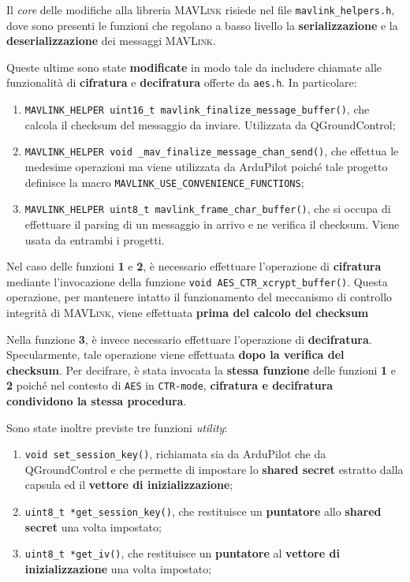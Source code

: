 \documentclass[a4paper, 12pt, oneside]{article}
\theoremstyle{definition}
\begin{document}
Il \textit{core} delle modifiche alla libreria \textsc{MAVLink} risiede nel file \texttt{mavlink\_helpers.h}, dove sono presenti le funzioni che regolano a basso livello la \textbf{serializzazione} e la \textbf{deserializzazione} dei messaggi \textsc{MAVLink}. 

Queste ultime sono state \textbf{modificate} in modo tale da includere chiamate alle funzionalità di \textbf{cifratura} e \textbf{decifratura} offerte da \texttt{aes.h}. In particolare:

\begin{enumerate}
    \item \texttt{MAVLINK_HELPER uint16_t mavlink_finalize_message_buffer()}, che calcola il checksum del messaggio da inviare. Utilizzata da QGroundControl;
    \item \texttt{MAVLINK_HELPER void _mav_finalize_message_chan_send()}, che effettua le medesime operazioni ma viene utilizzata da ArduPilot poiché tale progetto definisce la macro \texttt{MAVLINK\_USE\_CONVENIENCE\_FUNCTIONS};
    \item \texttt{MAVLINK_HELPER uint8_t mavlink_frame_char_buffer()}, che si occupa di effettuare il parsing di un messaggio in arrivo e ne verifica il checksum. Viene usata da entrambi i progetti.
\end{enumerate}

Nel caso delle funzioni \textbf{1} e \textbf{2}, è necessario effettuare l'operazione di \textbf{cifratura} mediante l'invocazione della funzione \texttt{void AES_CTR_xcrypt_buffer()}. Questa operazione, per mantenere intatto il funzionamento del meccanismo di controllo integrità di \textsc{MAVLink}, viene effettuata \textbf{prima del calcolo del checksum}

Nella funzione \textbf{3}, è invece necessario effettuare l'operazione di \textbf{decifratura}. Specularmente, tale operazione viene effettuata \textbf{dopo la verifica del checksum}. Per decifrare, è stata invocata la \textbf{stessa funzione} delle funzioni \textbf{1} e \textbf{2} poiché nel contesto di \texttt{AES} in \texttt{CTR-mode}, \textbf{cifratura e decifratura condividono la stessa procedura}.

Sono state inoltre previste tre funzioni \textit{utility}:

\begin{enumerate}
    \item \texttt{void set_session_key()}, richiamata sia da ArduPilot che da QGroundControl e che permette di impostare lo \textbf{shared secret} estratto dalla capsula ed il \textbf{vettore di inizializzazione};
    \item \texttt{uint8_t *get_session_key()}, che restituisce un \textbf{puntatore} allo \textbf{shared secret} una volta impostato;
    \item \texttt{uint8_t *get_iv()}, che restituisce un \textbf{puntatore} al \textbf{vettore di inizializzazione} una volta impostato;
\end{enumerate}
\end{document}
